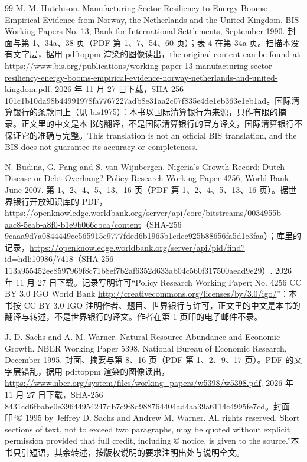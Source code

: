\begin{thebibliography}{99}
 M. M. Hutchison. Manufacturing Sector Resiliency to Energy Booms: Empirical Evidence from Norway, the Netherlands and the United Kingdom. BIS Working Papers No. 13, Bank for International Settlements, September 1990. 封面与第 1、34a、38 页（PDF 第 1、7、54、60 页）；表 4 在第 34a 页。扫描本没有文字层，据用 pdftoppm 渲染的图像读出，the original content can be found at \url{https://www.bis.org/publications/working-paper-13-manufacturing-sector-resiliency-energy-booms-empirical-evidence-norway-netherlands-and-united-kingdom.pdf}. 2026 年 11 月 27 日下载，SHA-256 101c1b10da98b44991978fa7767227adb8e31aa2c07f835e4de1eb363e1eb1ad。国际清算银行的条款同上（见 bis1975）：本书以国际清算银行为来源，只作有限的摘录。正文里的中文是本书的翻译，不是国际清算银行的官方译文，国际清算银行不保证它的准确与完整。This translation is not an official BIS translation, and the BIS does not guarantee its accuracy or completeness.

 N. Budina, G. Pang and S. van Wijnbergen. Nigeria's Growth Record: Dutch Disease or Debt Overhang? Policy Research Working Paper 4256, World Bank, June 2007. 第 1、2、4、5、13、16 页（PDF 第 1、2、4、5、13、16 页）。据世界银行开放知识库的 PDF，\url{https://openknowledge.worldbank.org/server/api/core/bitstreams/0034955b-aac8-5eab-a8f0-b1e9b066cbca/content}（SHA-256 9caaa9d7a0844449ce565915e9777fded6b1965b1cdcc925b88656fa5d1e3faa）；库里的记录，\url{https://openknowledge.worldbank.org/server/api/pid/find?id=hdl:10986/7418}（SHA-256 113a955452ee8597969f8c71b8ef7b2af6352d633ab04c560f317500aead9e29）. 2026 年 11 月 27 日下载。记录写明许可“Policy Research Working Paper; No. 4256 CC BY 3.0 IGO World Bank \url{http://creativecommons.org/licenses/by/3.0/igo/}”：本书按 CC BY 3.0 IGO 注明作者、题目、世界银行与许可，正文里的中文是本书的翻译与转述，不是世界银行的译文。作者在第 1 页印的电子邮件不录。

 J. D. Sachs and A. M. Warner. Natural Resource Abundance and Economic Growth. NBER Working Paper 5398, National Bureau of Economic Research, December 1995. 封面、摘要与第 8、16 页（PDF 第 1、2、9、17 页）。PDF 的文字层错乱，据用 pdftoppm 渲染的图像读出，\url{https://www.nber.org/system/files/working_papers/w5398/w5398.pdf}. 2026 年 11 月 27 日下载，SHA-256 8431cd6fbabe0e39644954247db7c9f8d988764404ad4aa39a6114c4995fe7cd。封面印“© 1995 by Jeffrey D. Sachs and Andrew M. Warner. All rights reserved. Short sections of text, not to exceed two paragraphs, may be quoted without explicit permission provided that full credit, including © notice, is given to the source.”本书只引短语，其余转述，按版权说明的要求注明出处与说明全文。


\end{thebibliography}
